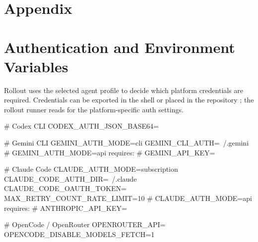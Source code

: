 \documentclass[11pt]{article}
\begin{document}
\section*{Appendix}


\section*{Authentication and Environment Variables}

  Rollout uses the selected agent profile to decide which platform credentials are required.
  Credentials can be exported in the shell or placed in the repository ; the rollout runner reads
   for the platform-specific auth settings.

  \begin{DocCode}
  # Codex CLI
  CODEX_AUTH_JSON_BASE64=

  # Gemini CLI
  GEMINI_AUTH_MODE=cli
  GEMINI_CLI_AUTH=~/.gemini
  # GEMINI_AUTH_MODE=api requires:
  # GEMINI_API_KEY=

  # Claude Code
  CLAUDE_AUTH_MODE=subscription
  CLAUDE_CODE_AUTH_DIR=~/.claude
  CLAUDE_CODE_OAUTH_TOKEN=
  MAX_RETRY_COUNT_RATE_LIMIT=10
  # CLAUDE_AUTH_MODE=api requires:
  # ANTHROPIC_API_KEY=

  # OpenCode / OpenRouter
  OPENROUTER_API=
  OPENCODE_DISABLE_MODELS_FETCH=1
  \end{DocCode}
\end{document}
